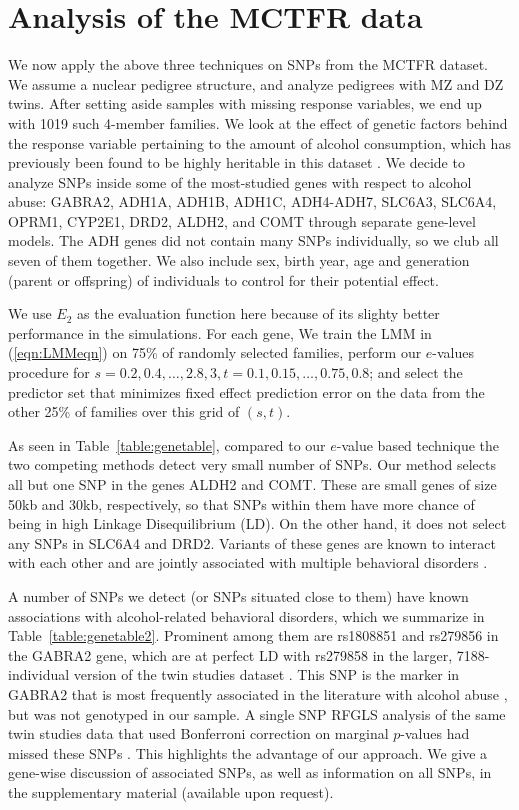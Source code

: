 \section{Analysis of the MCTFR data}
\label{sec:DataSection}

We now apply the above three techniques on SNPs from the MCTFR dataset. We assume a nuclear pedigree structure, and analyze pedigrees with MZ and DZ twins. After setting aside samples with missing response variables, we end up with 1019 such 4-member families. We look at the effect of genetic factors behind the response variable pertaining to the amount of alcohol consumption, which has previously been found to be highly heritable in this dataset \citep{McGueEtal13}. We decide to analyze SNPs inside some of the most-studied genes with respect to alcohol abuse: GABRA2, ADH1A, ADH1B, ADH1C, ADH4-ADH7, SLC6A3, SLC6A4, OPRM1, CYP2E1, DRD2, ALDH2, and COMT \citep{CoombesThesis16} through separate gene-level models. The ADH genes did not contain many SNPs individually, so we club all seven of them together. We also include sex, birth year, age and generation (parent or offspring) of individuals to control for their potential effect.

We use $E_2$ as the evaluation function here because of its slighty better performance in the simulations. For each gene, We train the LMM in (\ref{eqn:LMMeqn}) on 75\% of randomly selected families, perform our $e$-values procedure for $s = 0.2, 0.4, \ldots, 2.8, 3, t = 0.1, 0.15, \ldots, 0.75, 0.8$; and select the predictor set that minimizes fixed effect prediction error on the data from the other 25\% of families over this grid of $(s,t)$.  

As seen in Table~\ref{table:genetable}, compared to our $e$-value based technique the two competing methods detect very small number of SNPs. Our method selects all but one SNP in the genes ALDH2 and COMT. These are small genes of size 50kb and 30kb, respectively, so that SNPs within them have more chance of being in high Linkage Disequilibrium (LD). On the other hand, it does not select any SNPs in SLC6A4 and DRD2. Variants of these genes are known to interact with each other and are jointly associated with multiple behavioral disorders \citep{KarpyakEtal10, WangEtal14}.

A number of SNPs we detect (or SNPs situated close to them) have known associations with alcohol-related behavioral disorders, which we summarize in Table~\ref{table:genetable2}. Prominent among them are rs1808851 and rs279856 in the GABRA2 gene, which are at perfect LD with rs279858 in the larger, 7188-individual version of the twin studies dataset \citep{IronsThesis12}. This SNP is the marker in GABRA2 that is most frequently associated in the literature with alcohol abuse \citep{CuiEtal12}, but was not genotyped in our sample. A single SNP RFGLS analysis of the same twin studies data that used Bonferroni correction on marginal $p$-values had missed these SNPs \citep{IronsThesis12}. This highlights the advantage of our approach. We give a gene-wise discussion of associated SNPs, as well as information on all SNPs, in the supplementary material (available upon request).

